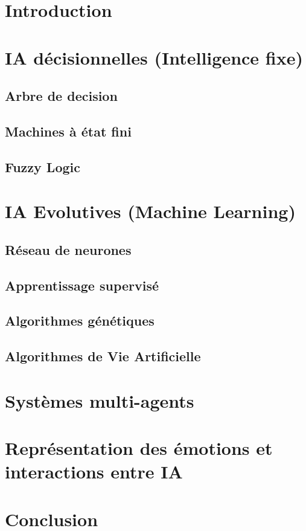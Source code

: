 \documentclass[asi]{picINSA}
\begin{document}
	
	\couverture{}

\tableofcontents{}

\chapter{Introduction}

\chapter{IA décisionnelles (Intelligence fixe)}
\section{Arbre de decision}
\section{Machines à état fini}
\section{Fuzzy Logic}
  
\chapter{IA Evolutives (Machine Learning)}
\section{Réseau de neurones}
\section{Apprentissage supervisé}
\section{Algorithmes génétiques}
\section{Algorithmes de Vie Artificielle}
  
\chapter{Systèmes multi-agents}

\chapter{Représentation des émotions et interactions entre IA}

\chapter{Conclusion}


  
\end{document}
